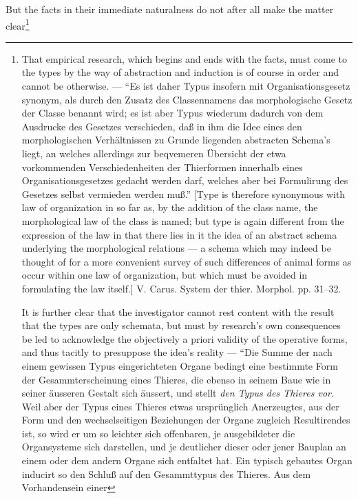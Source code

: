 \documentclass[12pt,a4paper]{book}
\begin{document}
\setcounter{footnote}{0}
But the facts in their immediate naturalness do not after all make the matter
clear\footnote{That empirical research, which begins and ends with the facts, must
come to the types by the way of abstraction and induction is of course in order and
cannot be otherwise. --- ``Es ist daher Typus insofern mit Organisationsgesetz synonym,
als durch den Zusatz des Classennamens das morphologische Gesetz der Classe benannt
wird; es ist aber Typus wiederum dadurch von dem Ausdrucke des Gesetzes verschieden,
daß in ihm die Idee eines den morphologischen Verhältnissen zu Grunde liegenden
abstracten Schema's liegt, an welches allerdings zur beqvemeren Übersicht der etwa
vorkommenden Verschiedenheiten der Thierformen innerhalb eines Organisationsgesetzes
gedacht werden darf, welches aber bei Formulirung des Gesetzes selbst vermieden werden
muß.'' [Type is therefore synonymous with law of organization in so far as, by the
addition of the class name, the morphological law of the class is named; but type is
again different from the expression of the law in that there lies in it the idea of an
abstract schema underlying the morphological relations --- a schema which may indeed be
thought of for a more convenient survey of such differences of animal forms as occur
within one law of organization, but which must be avoided in formulating the law
itself.] V. Carus. System der thier. Morphol. pp. 31--32.
\par It is further clear that the investigator cannot rest content with the result
that the types are only schemata, but must by research's own consequences be led to
acknowledge the objectively a priori validity of the operative forms, and thus tacitly
to presuppose the idea's reality --- ``Die Summe der nach einem gewissen Typus
eingerichteten Organe bedingt eine bestimmte Form der Gesammterscheinung eines
Thieres, die ebenso in seinem Baue wie in seiner äusseren Gestalt sich äussert, und
stellt \emph{den Typus des Thieres vor.} Weil aber der Typus eines Thieres etwas
ursprünglich Anerzeugtes, aus der Form und den wechselseitigen Beziehungen der Organe
zugleich Resultirendes ist, so wird er um so leichter sich offenbaren, je
ausgebildeter die Organsysteme sich darstellen, und je deutlicher dieser oder jener
Bauplan an einem oder dem andern Organe sich entfaltet hat. Ein typisch gebautes Organ
inducirt so den Schluß auf den Gesammttypus des Thieres. Aus dem Vorhandensein einer
}
\end{document}
